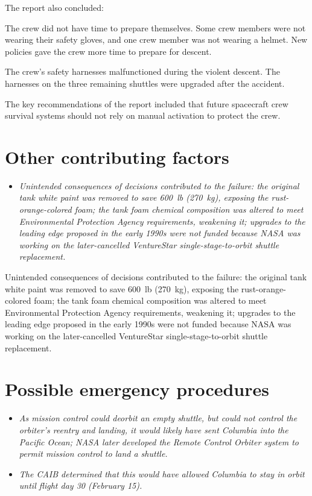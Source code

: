 The report also concluded:

The crew did not have time to prepare themselves. Some crew members were
not wearing their safety gloves, and one crew member was not wearing a
helmet. New policies gave the crew more time to prepare for descent.

The crew's safety harnesses malfunctioned during the violent descent.
The harnesses on the three remaining shuttles were upgraded after the
accident.

The key recommendations of the report included that future spacecraft
crew survival systems should not rely on manual activation to protect
the crew.

\section{Other contributing factors}\label{other-contributing-factors}

\begin{itemize}
\item
  \emph{Unintended consequences of decisions contributed to the failure:
  the original tank white paint was removed to save 600~lb (270~kg),
  exposing the rust-orange-colored foam; the tank foam chemical
  composition was altered to meet Environmental Protection Agency
  requirements, weakening it; upgrades to the leading edge proposed in
  the early 1990s were not funded because NASA was working on the
  later-cancelled VentureStar single-stage-to-orbit shuttle
  replacement.}
\end{itemize}

Unintended consequences of decisions contributed to the failure: the
original tank white paint was removed to save 600~lb (270~kg), exposing
the rust-orange-colored foam; the tank foam chemical composition was
altered to meet Environmental Protection Agency requirements, weakening
it; upgrades to the leading edge proposed in the early 1990s were not
funded because NASA was working on the later-cancelled VentureStar
single-stage-to-orbit shuttle replacement.

\section{Possible emergency
procedures}\label{possible-emergency-procedures}

\begin{itemize}
\item
  \emph{As mission control could deorbit an empty shuttle, but could not
  control the orbiter's reentry and landing, it would likely have sent
  Columbia into the Pacific Ocean; NASA later developed the Remote
  Control Orbiter system to permit mission control to land a shuttle.}
\item
  \emph{The CAIB determined that this would have allowed Columbia to
  stay in orbit until flight day 30 (February 15).}
\end{itemize}

